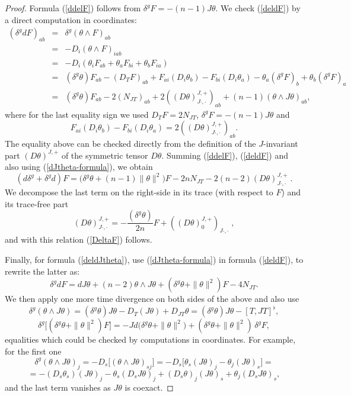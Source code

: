 \documentclass[a4paper,11pt]{amsart}
\theoremstyle{definition}
\renewcommand{\[}{\begin{equation*}}
\renewcommand{\]}{\end{equation*}}
\begin{document}
\begin{proof} 
Formula (\ref{ddelF}) follows from
$\delta^g F = -(n-1) J \theta $. We check (\ref{deldF}) by a direct computation in coordinates:
\begin{eqnarray*}
 (\delta^g d  F)_{ab} &=& \delta^g (\theta \wedge F)_{ab}\\
 &=& - D_i (\theta \wedge F)_{iab}\\ 
 &=& -D_i ( \theta_i F_{ab} + \theta_a F_{bi} + \theta_b F_{ia})\\
 &=& (\delta^g \theta) F_{ab} - (D_TF)_{ab} + F_{ai} (D_i \theta_b) - F_{bi} (D_i \theta_a) - \theta_a (\delta^g F)_b + \theta_b (\delta^g F)_a \\
 &=& (\delta^g \theta) F_{ab} - 2(N_{JT})_{ab} + 2 ((D \theta)^{J,+}_{J\cdot,\cdot})_{ab} + (n-1) (\theta \wedge J \theta)_{ab},
 \end{eqnarray*}
where for the last equality sign we used $D_T F = 2N_{JT}$, $\delta^g F = -(n-1) J \theta $ and
$$ F_{ai} (D_i \theta_b) - F_{bi} (D_i \theta_a) = 2 ((D \theta)^{J,+}_{J\cdot,\cdot})_{ab}. $$
The equality above can be checked directly from the definition of the $J$-invariant part
$(D \theta)^{J,+}$ of the symmetric tensor $D \theta$. Summing (\ref{ddelF}), (\ref{deldF}) and also using (\ref{dJtheta-formula}), we obtain
$$ (d \delta^g + \delta^g d)  F = \big( \delta^g \theta + (n-1)\|\theta\|^2 \big) F - 2n N_{JT} - 2(n-2) (D \theta)^{J,+}_{J\cdot,\cdot} \; .$$
We decompose the last term on the right-side in its trace (with respect to $F$) and its trace-free part
$$ (D \theta)^{J,+}_{J\cdot,\cdot} = -\frac{(\delta^g \theta)}{2n} F + ((D \theta)^{J,+}_0)_{J\cdot,\cdot} \; , $$
and with this relation (\ref{DeltaF}) follows.



Finally, for formula (\ref{deldJtheta}), use (\ref{dJtheta-formula}) in formula (\ref{deldF}), to rewrite the latter as:
$$ \delta^g d  F = dJ \theta +(n-2) \theta \wedge J\theta + ( \delta^g \theta + \| \theta \|^2) F - 4N_{JT}.$$
We then apply one more time divergence on both sides of the above and also use
$$\delta^g (\theta \wedge J \theta) = (\delta^g \theta) J\theta - D_T (J\theta) + D_{JT} \theta  = (\delta^g \theta) J\theta - [T, JT]^{\flat},$$
$$ \delta^g \big[ (\delta^g \theta +\|\theta \|^2) F \big] = - J d\big( \delta^g \theta + \|\theta \|^2 \big) + (\delta^g \theta + \|\theta\|^2) \, \delta^g F,$$
equalities which could be checked by computations in coordinates. For example, for the first one
$$\delta^g (\theta \wedge J \theta)_j = - D_s \big[ (\theta \wedge J\theta)_{sj}\big] = - D_s \big[ \theta_s (J\theta)_j - \theta_j (J\theta)_s \big] =$$
$$ = -(D_s \theta_s) (J\theta)_j - \theta_s (D_s J\theta)_j + (D_s \theta)_j (J\theta)_s + \theta_j (D_s J\theta)_s ,$$
and the last term vanishes as $J\theta $ is coexact. 
\end{proof}
\end{document}
